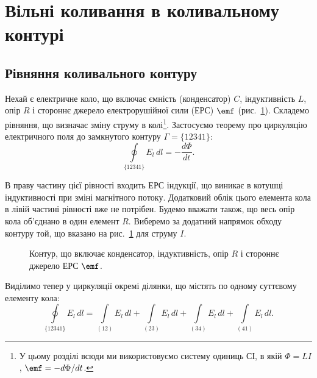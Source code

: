 \section{Вільні коливання в коливальному контурі}\hypertarget{free-oscillations}{}

\subsection*{Рівняння коливального контуру}

Нехай є електричне коло, що включає ємність (конденсатор) $C$, індуктивність $L$, опір $R$ і стороннє джерело електрорушійної сили (ЕРС) $\emf$ (рис.~\ref{tikz:LCR_circuit}). Складемо рівняння, що визначає зміну струму в колі\footnote{У цьому розділі всюди ми використовуємо систему одиниць СІ, в якій $\Phi = LI$, $\emf = -d\Phi/dt$.}. Застосуємо теорему про циркуляцію електричного поля до замкнутого контуру $\Gamma = \{12341\}$:
\begin{equation}\label{eq:circulation}
	\oint\limits_{\{12341\}} E_l \, dl = -\frac{d\Phi}{dt}.
\end{equation}

В праву частину цієї рівності входить ЕРС індукції, що виникає в
котушці індуктивності при зміні магнітного потоку. Додатковий
облік цього елемента кола в лівій частині рівності вже не
потрібен. Будемо вважати також, що весь опір кола об'єднано в
один елемент $R$. Виберемо за додатний напрямок обходу контуру
той, що вказано на рис.~\ref{tikz:LCR_circuit} для струму $I$.

\begin{figure}[h!]
	\centering
	\caption{Контур, що включає конденсатор, індуктивність, опір $R$ і стороннє джерело ЕРС $\emf$.}
	\label{tikz:LCR_circuit}
\end{figure}

Виділимо тепер у циркуляції окремі ділянки, що містять по
одному суттєвому елементу кола:
\begin{equation}\label{eq:circulation_decomposed}
	\oint\limits_{\{12341\}} E_l \, dl
	= \int\limits_{(12)} E_l \, dl
	+ \int\limits_{(23)} E_l \, dl
	+ \int\limits_{(34)} E_l \, dl
	+ \int\limits_{(41)} E_l \, dl.
\end{equation}

